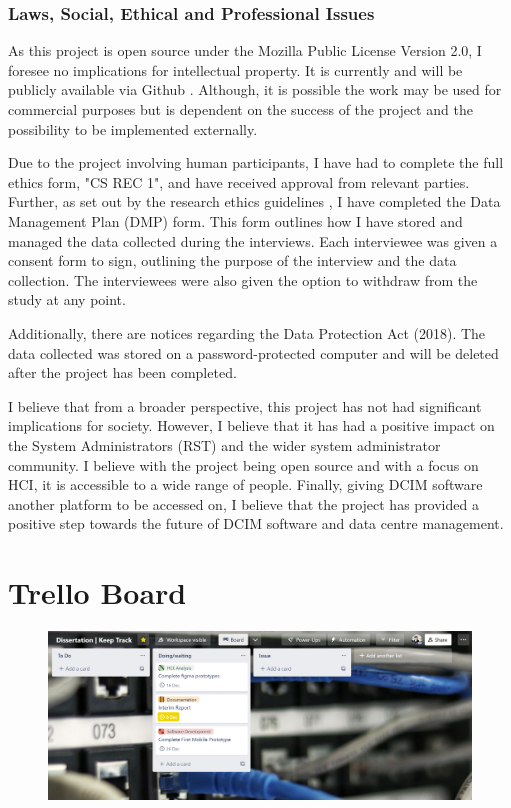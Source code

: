\documentclass [11pt,a4paper]{article}
\begin{document}
\subsubsection{Laws, Social, Ethical and Professional Issues}
\label{sec:computer_laws}
As this project is open source under the Mozilla Public License Version 2.0, I foresee no implications for intellectual property. It is currently and will be publicly available via Github \cite{keeptrackgithub}. Although, it is possible the work may be used for commercial purposes but is dependent on the success of the project and the possibility to be implemented externally.

Due to the project involving human participants, I have had to complete the full ethics form, "CS REC 1", and have received approval from relevant parties. Further, as set out by the research ethics guidelines \cite{ethicsguidelines}, I have completed the Data Management Plan (DMP) form. This form outlines how I have stored and managed the data collected during the interviews. Each interviewee was given a consent form to sign, outlining the purpose of the interview and the data collection. The interviewees were also given the option to withdraw from the study at any point.

Additionally, there are notices regarding the Data Protection Act (2018). The  data collected was stored on a password-protected computer and will be deleted after the project has been completed.

I believe that from a broader perspective, this project has not had significant implications for society. However, I believe that it has had a positive impact on the System Administrators (RST) and the wider system administrator community. I believe with the project being open source and with a focus on HCI, it is accessible to a wide range of people. Finally, giving DCIM software another platform to be accessed on, I believe that the project has provided a positive step towards the future of DCIM software and data centre management.
\pagebreak


 

\pagebreak
{}

\appendix
\section{Trello Board}
\label{sec:trello_board}
\begin{figure}[H]
    \centering
    \includegraphics[width=1\textwidth]{images/trello-board.png}
\end{figure}   
\end{document}

